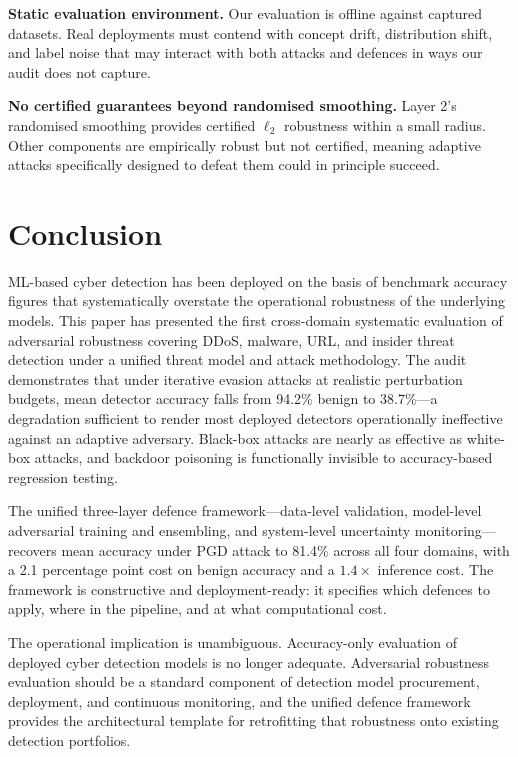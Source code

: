 \documentclass[sigconf,nonacm]{acmart}
\begin{document}
\textbf{Static evaluation environment.} Our evaluation is offline against
captured datasets. Real deployments must contend with concept drift,
distribution shift, and label noise that may interact with both attacks and
defences in ways our audit does not capture.

\textbf{No certified guarantees beyond randomised smoothing.} Layer 2's
randomised smoothing provides certified $\ell_2$ robustness within a small
radius. Other components are empirically robust but not certified, meaning
adaptive attacks specifically designed to defeat them could in principle
succeed.

\section{Conclusion}
\label{sec:conclusion}

ML-based cyber detection has been deployed on the basis of benchmark
accuracy figures that systematically overstate the operational robustness of
the underlying models. This paper has presented the first cross-domain
systematic evaluation of adversarial robustness covering DDoS, malware,
URL, and insider threat detection under a unified threat model and attack
methodology. The audit demonstrates that under iterative evasion attacks at
realistic perturbation budgets, mean detector accuracy falls from 94.2\%
benign to 38.7\%---a degradation sufficient to render most deployed
detectors operationally ineffective against an adaptive adversary. Black-box
attacks are nearly as effective as white-box attacks, and backdoor poisoning
is functionally invisible to accuracy-based regression testing.

The unified three-layer defence framework---data-level validation,
model-level adversarial training and ensembling, and system-level uncertainty
monitoring---recovers mean accuracy under PGD attack to 81.4\% across all four
domains, with a 2.1 percentage point cost on benign accuracy and a $1.4\times$
inference cost. The framework is constructive and deployment-ready: it
specifies which defences to apply, where in the pipeline, and at what
computational cost.

The operational implication is unambiguous. Accuracy-only evaluation of
deployed cyber detection models is no longer adequate. Adversarial robustness
evaluation should be a standard component of detection model procurement,
deployment, and continuous monitoring, and the unified defence framework
provides the architectural template for retrofitting that robustness onto
existing detection portfolios.
\end{document}
